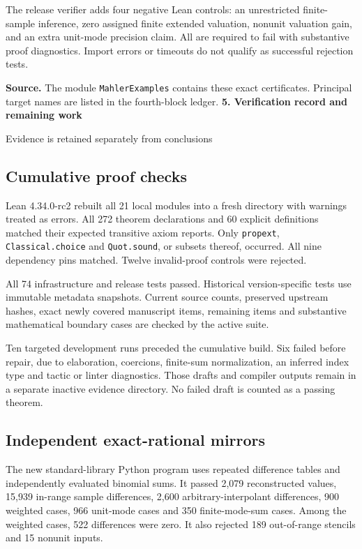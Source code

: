 \documentclass[11pt]{article}
\newcommand{\pageheading}[2]{{\Large\bfseries\color{ink}#1}\par{\small #2}\par\medskip}
\begin{document}
The release verifier adds four negative Lean controls: an unrestricted finite-sample inference, zero assigned finite extended valuation, nonunit valuation gain, and an extra unit-mode precision claim. All are required to fail with substantive proof diagnostics. Import errors or timeouts do not qualify as successful rejection tests.

\textbf{Source.} The module \texttt{MahlerExamples} contains these exact certificates. Principal target names are listed in the fourth-block ledger.
\newpage
\pageheading{5. Verification record and remaining work}{Evidence is retained separately from conclusions}
\subsection*{Cumulative proof checks}
Lean 4.34.0-rc2 rebuilt all 21 local modules into a fresh directory with warnings treated as errors. All 272 theorem declarations and 60 explicit definitions matched their expected transitive axiom reports. Only \texttt{propext}, \texttt{Classical.choice} and \texttt{Quot.sound}, or subsets thereof, occurred. All nine dependency pins matched. Twelve invalid-proof controls were rejected.

All 74 infrastructure and release tests passed. Historical version-specific tests use immutable metadata snapshots. Current source counts, preserved upstream hashes, exact newly covered manuscript items, remaining items and substantive mathematical boundary cases are checked by the active suite.

Ten targeted development runs preceded the cumulative build. Six failed before repair, due to elaboration, coercions, finite-sum normalization, an inferred index type and tactic or linter diagnostics. Those drafts and compiler outputs remain in a separate inactive evidence directory. No failed draft is counted as a passing theorem.

\subsection*{Independent exact-rational mirrors}
The new standard-library Python program uses repeated difference tables and independently evaluated binomial sums. It passed 2,079 reconstructed values, 15,939 in-range sample differences, 2,600 arbitrary-interpolant differences, 900 weighted cases, 966 unit-mode cases and 350 finite-mode-sum cases. Among the weighted cases, 522 differences were zero. It also rejected 189 out-of-range stencils and 15 nonunit inputs.
\end{document}
